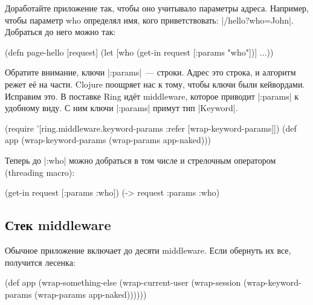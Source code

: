 Доработайте приложение так, чтобы оно учитывало параметры адреса. Например,
чтобы параметр who определял имя, кого приветствовать:
\spverb|/hello?who=John|. Добраться до него можно так:

\begin{english}
  \begin{clojure}
(defn page-hello [request]
  (let [who (get-in request [:params "who"])]
    ...))
  \end{clojure}
\end{english}

Обратите внимание, ключи \spverb|:params|~--- строки. Адрес это строка, и
алгоритм режет е\"{е} на части. Clojure поощряет нас к тому, чтобы ключи были
кейвордами. Исправим это. В поставке Ring ид\"{е}т middleware, которое приводит
\spverb|:params| к удобному виду. С ним ключи \spverb|:params| примут тип
\spverb|Keyword|.


\begin{english}
  \begin{clojure}
(require '[ring.middleware.keyword-params
           :refer [wrap-keyword-params]])
(def app (wrap-keyword-params (wrap-params app-naked)))
  \end{clojure}
\end{english}

Теперь до \spverb|:who| можно добраться в том числе и стрелочным оператором
(threading macro):

\begin{english}
  \begin{clojure}
(get-in request [:params :who])
(-> request :params :who)
  \end{clojure}
\end{english}

\subsection{Стек middleware}

Обычное приложение включает до десяти middleware. Если обернуть их все,
получится лесенка:

\begin{english}
  \begin{clojure}
(def app
  (wrap-something-else
    (wrap-current-user
      (wrap-session
        (wrap-keyword-params
          (wrap-params app-naked))))))
  \end{clojure}
\end{english}


